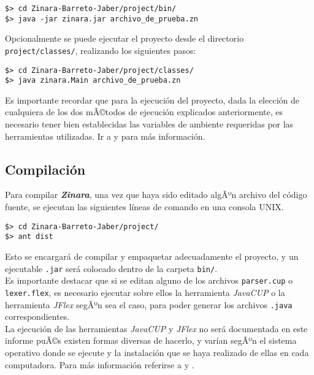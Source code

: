 \documentclass[12pt, spanish]{report}
\begin{document}
\begin{verbatim}
$> cd Zinara-Barreto-Jaber/project/bin/
$> java	-jar zinara.jar archivo_de_prueba.zn
\end{verbatim}

Opcionalmente se puede ejecutar el proyecto desde el directorio
\texttt{project/classes/}, realizando los siguientes pasos:

\begin{verbatim}
$> cd Zinara-Barreto-Jaber/project/classes/
$> java zinara.Main archivo_de_prueba.zn
\end{verbatim}

Es importante recordar que para la ejecuci\'on del proyecto, dada la
elecci\'on de cualquiera de los dos mÃ©todos de ejecuci\'on explicados
anteriormente, es necesario tener bien establecidas las variables de
ambiente requeridas por las herramientas utilizadas. Ir a
\cite{javacup} y \cite{jflex} para m\'as informaci\'on.

\subsection{Compilaci\'on}
\label{sec:compilacion}
Para compilar \emph{\textbf{Zinara}}, una vez que haya sido editado
algÃºn archivo del c\'odigo fuente, se ejecutan las siguientes l\'ineas de
comando en una consola UNIX.

\begin{verbatim}
$> cd Zinara-Barreto-Jaber/project/
$> ant dist
\end{verbatim}

Esto se encargar\'a de compilar y empaquetar adecuadamente el proyecto,
y un ejecutable \texttt{.jar} ser\'a colocado dentro de la carpeta
\texttt{bin/}.\\

Es importante destacar que si se editan alguno de los archivos
\texttt{parser.cup} o \texttt{lexer.flex}, es necesario ejecutar sobre
ellos la herramienta \emph{JavaCUP} o la herramienta \emph{JFlex}
segÃºn sea el caso, para poder generar los archivos \texttt{.java}
correspondientes.\\

La ejecuci\'on de las herramientas \emph{JavaCUP} y \emph{JFlex} no ser\'a
documentada en este informe puÃ©s existen formas diversas de hacerlo, y
var\'ian segÃºn el sistema operativo donde se ejecute y la instalaci\'on
que se haya realizado de ellas en cada computadora. Para m\'as
informaci\'on referirse a \cite{javacup} y \cite{jflex}.\\
\end{document}
